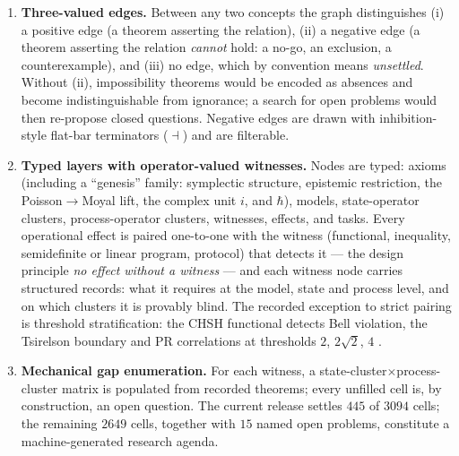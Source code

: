 \documentclass[11pt,a4paper]{article}
\theoremstyle{definition}
\begin{document}
\begin{enumerate}
  \item \textbf{Three-valued edges.} Between any two concepts the graph
  distinguishes (i) a positive edge (a theorem asserting the relation), (ii) a
  negative edge (a theorem asserting the relation \emph{cannot} hold: a no-go,
  an exclusion, a counterexample), and (iii) no edge, which by convention means
  \emph{unsettled}. Without (ii), impossibility theorems would be encoded as
  absences and become indistinguishable from ignorance; a search for open
  problems would then re-propose closed questions. Negative edges are drawn
  with inhibition-style flat-bar terminators ($\dashv$) and are filterable.

  \item \textbf{Typed layers with operator-valued witnesses.} Nodes are typed:
  axioms (including a ``genesis'' family: symplectic structure, epistemic
  restriction, the Poisson$\to$Moyal lift, the complex unit $i$, and $\hbar$),
  models, state-operator clusters, process-operator clusters, witnesses,
  effects, and tasks. Every operational effect is paired one-to-one with the
  witness (functional, inequality, semidefinite or linear program, protocol)
  that detects it --- the design principle \emph{no effect without a witness}
  --- and each witness node carries structured records: what it requires at
  the model, state and process level, and on which clusters it is provably
  blind. The recorded exception to strict pairing is threshold stratification:
  the CHSH functional detects Bell violation, the Tsirelson boundary and PR
  correlations at thresholds $2$, $2\sqrt2$, $4$
  \cite{chsh1969,tsirelson1980,pr1994}.

  \item \textbf{Mechanical gap enumeration.} For each witness, a
  state-cluster$\times$process-cluster matrix is populated from recorded
  theorems; every unfilled cell is, by construction, an open question. The
  current release settles $445$ of $3094$ cells; the remaining $2649$ cells,
  together with $15$ named open problems, constitute a machine-generated
  research agenda.
\end{enumerate}
\end{document}

